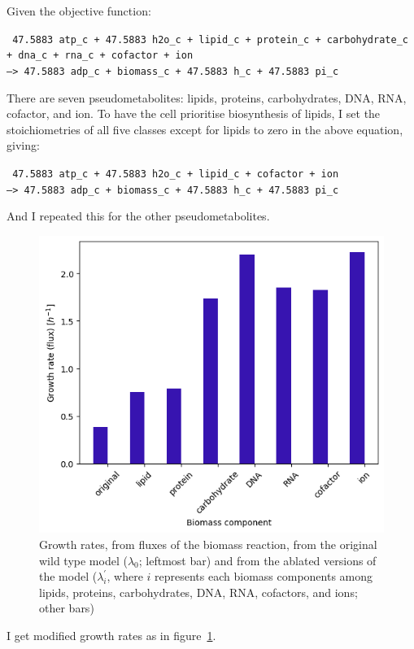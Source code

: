 Given the objective function:

\texttt{
  47.5883 atp\_c + 47.5883 h2o\_c + lipid\_c + protein\_c + carbohydrate\_c\\
  + dna\_c + rna\_c + cofactor + ion \\
  --> 47.5883 adp\_c + biomass\_c + 47.5883 h\_c + 47.5883 pi\_c
}

There are seven pseudometabolites: lipids, proteins, carbohydrates, DNA, RNA, cofactor, and ion.
To have the cell prioritise biosynthesis of lipids, I set the stoichiometries of all five classes except for lipids to zero in the above equation, giving:

\texttt{
  47.5883 atp\_c + 47.5883 h2o\_c + lipid\_c + cofactor + ion \\
  --> 47.5883 adp\_c + biomass\_c + 47.5883 h\_c + 47.5883 pi\_c
}

And I repeated this for the other pseudometabolites.

\begin{figure}
  \centering
  \includegraphics[width=.9\linewidth]{ablation_example_fluxes.png}
  \caption{
    Growth rates, from fluxes of the biomass reaction, from the original wild type model ($\lambda_{0}$; leftmost bar) and from the ablated versions of the model ($\lambda_{i}^{\prime}$, where $i$ represents each biomass components among lipids, proteins, carbohydrates, DNA, RNA, cofactors, and ions; other bars)
  }
  \label{fig:model-ablate-fluxes}
\end{figure}

I get modified growth rates as in figure~\ref{fig:model-ablate-fluxes}.

